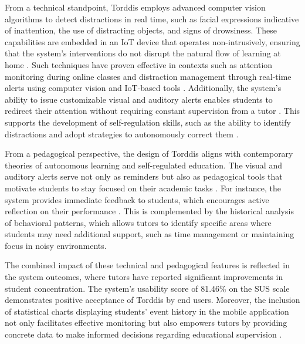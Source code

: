                 From a technical standpoint, Torddis employs advanced computer vision algorithms to detect distractions in real time, such as facial expressions indicative of inattention, the use of distracting objects, and signs of drowsiness. These capabilities are embedded in an IoT device that operates non-intrusively, ensuring that the system's interventions do not disrupt the natural flow of learning at home \citep{Roy2022, Chen2022, Ucar2022Recognizing, Asish2022Detecting}. Such techniques have proven effective in contexts such as attention monitoring during online classes and distraction management through real-time alerts using computer vision and IoT-based tools \citep{Chen2022, Ucar2022Recognizing}. Additionally, the system's ability to issue customizable visual and auditory alerts enables students to redirect their attention without requiring constant supervision from a tutor \citep{Ackermans2025Young}. This supports the development of self-regulation skills, such as the ability to identify distractions and adopt strategies to autonomously correct them \citep{Wang2025Development}.
                
                From a pedagogical perspective, the design of Torddis aligns with contemporary theories of autonomous learning and self-regulated education. The visual and auditory alerts serve not only as reminders but also as pedagogical tools that motivate students to stay focused on their academic tasks \citep{Mohamed2018Implementing}. For instance, the system provides immediate feedback to students, which encourages active reflection on their performance \citep{Ackermans2025Young}. This is complemented by the historical analysis of behavioral patterns, which allows tutors to identify specific areas where students may need additional support, such as time management or maintaining focus in noisy environments.
                
                The combined impact of these technical and pedagogical features is reflected in the system outcomes, where tutors have reported significant improvements in student concentration. The system's usability score of 81.46\% on the SUS scale demonstrates positive acceptance of Torddis by end users. Moreover, the inclusion of statistical charts displaying students’ event history in the mobile application not only facilitates effective monitoring but also empowers tutors by providing concrete data to make informed decisions regarding educational supervision \citep{Wang2025Development}.
                

